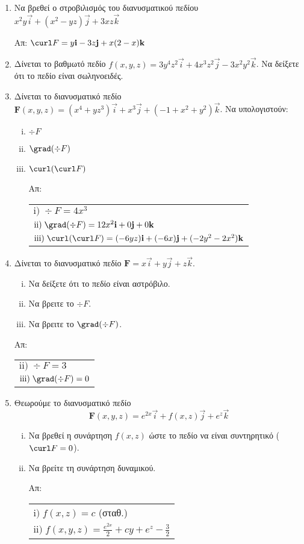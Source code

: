 \begin{enumerate}
\item Να βρεθεί ο στροβιλισμός του διανυσματικού πεδίου 
$ x^2y\vec{i}+(x^2-yz)\vec{j}+3xz\vec{k} $

\hfill Απ: $\curl F=y\vec{i}-3z\vec{j}+x(2-x)\vec{k}$

\item Δίνεται το βαθμωτό πεδίο 
  $f(x,y,z)=3y^4z^2\vec{i}+4x^3z^2\vec{j}-3x^2y^2\vec{k}$. Να δείξετε ότι το 
  πεδίο είναι σωληνοειδές.

\item Δίνεται το διανυσματικό πεδίο 
  $\boldsymbol{F}(x,y,z)=(x^4+yz^3)\vec{i}+x^3\vec{j}+(-1+x^2+y^2)\vec{k}$. 
  Να υπολογιστούν:
\begin{enumerate}[i)]
\item $\div F$
\item $\grad(\div F)$
\item $\curl(\curl F)$

\hfill Απ: \begin{tabular}{l}
  $\mathrm{i)}\; \div F=4x^3$ \\
  $\mathrm{ii)}\; \grad(\div F)=12x^2\vec{i}+0\vec{j}+0\vec{k}$ \\
  $\mathrm{iii)}\; \curl(\curl F)=(-6yz)\vec{i}+(-6x)\vec{j}+(-2y^2-2x^2)\vec{k}$
\end{tabular}

\end{enumerate}

\item Δίνεται το διανυσματικό πεδίο $\boldsymbol{F}=x\vec{i}+y\vec{j}+z\vec{k}$. 
\begin{enumerate}[i)]
\item Να δείξετε ότι το πεδίο είναι αστρόβιλο.
\item Να βρειτε το $\div F$.
\item Να βρειτε το $\grad(\div F)$.
\end{enumerate}

\hfill Απ: \begin{tabular}{l}
  $\mathrm{ii)}\; \div F=3$ \\
  $\mathrm{iii)}\; \grad(\div F)=0$

\end{tabular}

\item Θεωρούμε το διανυσματικό πεδίο
\[
\boldsymbol{F}(x,y,z)=e^{2x}\vec{i}+f(x,z)\vec{j}+e^z\vec{k}
\]
\begin{enumerate}[i)]
\item Να βρεθεί η συνάρτηση $f(x,z)$ ώστε το πεδίο να είναι συντηρητικό ($\curl F=0$).
\item Να βρείτε τη συνάρτηση δυναμικού.

\hfill Απ: \begin{tabular}{l}
  $\mathrm{i)}\; f(x,z)=c$ (σταθ.) \\
  $\mathrm{ii)}\;f(x,y,z)=\frac{e^{2x}}{2}+cy+e^z-\frac{3}{2}$
\end{tabular}

\end{enumerate}
\end{enumerate}



